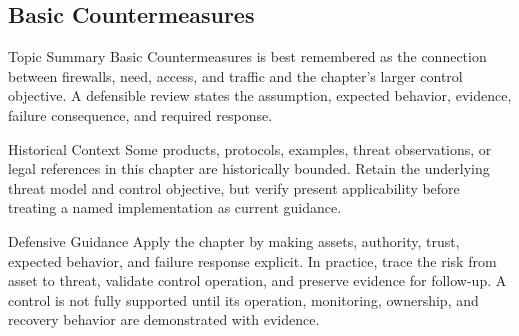 \documentclass[11pt,letterpaper]{article}
\begin{document}
\subsection*{Basic Countermeasures}
\begin{CornellNotesTable}
\end{CornellNotesTable}
\begin{CornellSummaryBox}{Topic Summary}
Basic Countermeasures is best remembered as the connection between firewalls, need, access, and traffic and the chapter's larger control objective. A defensible review states the assumption, expected behavior, evidence, failure consequence, and required response.
\end{CornellSummaryBox}
\begin{CornellWarningBox}{Historical Context}
Some products, protocols, examples, threat observations, or legal references in this chapter are historically bounded. Retain the underlying threat model and control objective, but verify present applicability before treating a named implementation as current guidance.
\end{CornellWarningBox}
\begin{CornellOverviewBox}{Defensive Guidance}
Apply the chapter by making assets, authority, trust, expected behavior, and failure response explicit. In practice, trace the risk from asset to threat, validate control operation, and preserve evidence for follow-up. A control is not fully supported until its operation, monitoring, ownership, and recovery behavior are demonstrated with evidence.
\end{CornellOverviewBox}
\end{document}
